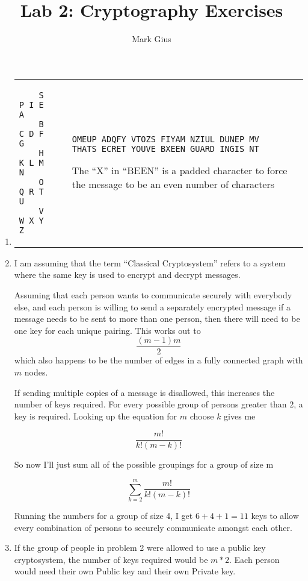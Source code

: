 \documentclass[11pt]{article}
\begin{document}
\author{Mark Gius}
\title{Lab 2: Cryptography Exercises}
\maketitle

\begin{enumerate}

\item %
\begin{tabular}{p{3cm} p{1cm} p{8cm}}
\begin{verbatim}
    S P I E A
    B C D F G
    H K L M N
    O Q R T U
    V W X Y Z
\end{verbatim} & &
\begin{verbatim}
OMEUP ADQFY VTOZS FIYAM NZIUL DUNEP MV
THATS ECRET YOUVE BXEEN GUARD INGIS NT
\end{verbatim}
The ``X'' in ``BEEN'' is a padded character to force the message to be an 
even number of characters
\end{tabular}

\item %
I am assuming that the term ``Classical Cryptosystem'' refers to a system where
the same key is used to encrypt and decrypt messages.

Assuming that each person wants to communicate securely with everybody else,
and each person is willing to send a separately encrypted message if a message
needs to be sent to more than one person, then there will need to be one key
for each unique pairing.  This works out to 
\[\frac{(m-1) m}{2}\]
which also happens to be the number of edges in a fully connected graph 
with $m$ nodes.

If sending multiple copies of a message is disallowed, this increases the
number of keys required.  For every possible group of persons greater than 2,
a key is required.  Looking up the equation for $m$ choose $k$ gives me

\[\frac{m!}{k!(m-k)!}\]

So now I'll just sum all of the possible groupings for a group of size m

\[
\sum_{k=2}^{m} \frac{m!}{k!(m-k)!}
\]

Running the numbers for a group of size 4, I get $6 + 4 + 1 = 11$ keys to 
allow every combination of persons to securely communicate amongst each other.

\item %

If the group of people in problem 2 were allowed to use a public key 
cryptosystem, the number of keys required would be $m * 2$. Each person would
need their own Public key and their own Private key.


\end{enumerate}
\end{document}
